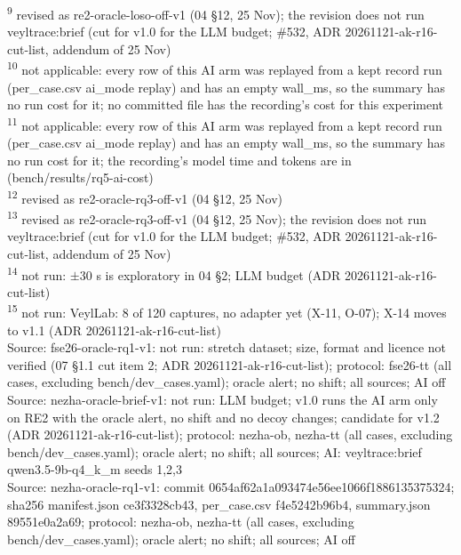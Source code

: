 \begin{table}[t]
\textsuperscript{9} revised as re2-oracle-loso-off-v1 (04 \S{}12, 25 Nov); the revision does not run veyltrace:brief (cut for v1.0 for the LLM budget; \#532, ADR 20261121-ak-r16-cut-list, addendum of 25 Nov)\\
\textsuperscript{10} not applicable: every row of this AI arm was replayed from a kept record run (per\_case.csv ai\_mode replay) and has an empty wall\_ms, so the summary has no run cost for it; no committed file has the recording's cost for this experiment\\
\textsuperscript{11} not applicable: every row of this AI arm was replayed from a kept record run (per\_case.csv ai\_mode replay) and has an empty wall\_ms, so the summary has no run cost for it; the recording's model time and tokens are in  (bench/results/rq5-ai-cost)\\
\textsuperscript{12} revised as re2-oracle-rq3-off-v1 (04 \S{}12, 25 Nov)\\
\textsuperscript{13} revised as re2-oracle-rq3-off-v1 (04 \S{}12, 25 Nov); the revision does not run veyltrace:brief (cut for v1.0 for the LLM budget; \#532, ADR 20261121-ak-r16-cut-list, addendum of 25 Nov)\\
\textsuperscript{14} not run: $\pm$30 s is exploratory in 04 \S{}2; LLM budget (ADR 20261121-ak-r16-cut-list)\\
\textsuperscript{15} not run: VeylLab: 8 of 120 captures, no adapter yet (X-11, O-07); X-14 moves to v1.1 (ADR 20261121-ak-r16-cut-list)\\
Source: fse26-oracle-rq1-v1: not run: stretch dataset; size, format and licence not verified (07 \S{}1.1 cut item 2; ADR 20261121-ak-r16-cut-list); protocol: fse26-tt (all cases, excluding bench/dev\_cases.yaml); oracle alert; no shift; all sources; AI off\\
Source: nezha-oracle-brief-v1: not run: LLM budget; v1.0 runs the AI arm only on RE2 with the oracle alert, no shift and no decoy changes; candidate for v1.2 (ADR 20261121-ak-r16-cut-list); protocol: nezha-ob, nezha-tt (all cases, excluding bench/dev\_cases.yaml); oracle alert; no shift; all sources; AI: veyltrace:brief qwen3.5-9b-q4\_k\_m seeds 1,2,3\\
Source: nezha-oracle-rq1-v1: commit 0654af62a1a093474e56ee1066f1886135375324; sha256 manifest.json ce3f3328cb43, per\_case.csv f4e5242b96b4, summary.json 89551e0a2a69; protocol: nezha-ob, nezha-tt (all cases, excluding bench/dev\_cases.yaml); oracle alert; no shift; all sources; AI off\\

\end{table}
